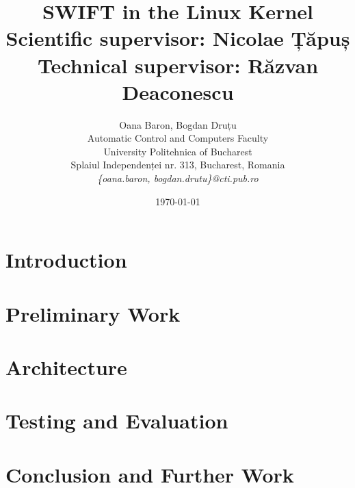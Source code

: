\documentclass[12pt]{article}
\title{\bfseries{SWIFT in the Linux Kernel\\
\large{\vspace*{0.4cm}Scientific supervisor: Nicolae Țăpuș\\ Technical supervisor: Răzvan Deaconescu}}}
\author{Oana Baron, Bogdan Druțu\\
Automatic Control and Computers Faculty\\
University Politehnica of Bucharest\\
Splaiul Independenței nr. 313, Bucharest, Romania \\
\emph{\{oana.baron, bogdan.drutu\}@cti.pub.ro}}
\date{\today}
\begin{document}
\maketitle

\begin{abstract}

\end{abstract}


\section{Introduction}
\label{sec:introduction}


\section{Preliminary Work}
\label{sec:preliminarywork}



\section{Architecture}
\label{sec:arch}


%

\section{Testing and Evaluation}
\label{sec:testing}



\section{Conclusion and Further Work}
\label{sec:summary}




\pagebreak



\end{document}
